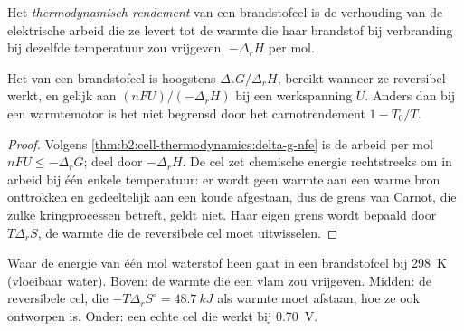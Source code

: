 \begin{definition}\label{def:b2:cell-thermodynamics:efficiency}
Het \emph{thermodynamisch rendement} van een
brandstofcel is de verhouding van de elektrische arbeid die ze levert tot de warmte die haar brandstof
bij verbranding bij dezelfde temperatuur zou vrijgeven, $-\Delta_r H$ per mol.
\end{definition}

\begin{proposition}\label{prop:b2:cell-thermodynamics:efficiency}
Het  van een brandstofcel is hoogstens $\Delta_r G/\Delta_r H$,
bereikt wanneer ze reversibel werkt, en gelijk aan $(nFU)/(-\Delta_r H)$ bij een
werkspanning $U$. Anders dan bij een warmtemotor is het niet begrensd door het carnotrendement
$1 - T_0/T$.
\end{proposition}

\begin{proof}
Volgens \cref{thm:b2:cell-thermodynamics:delta-g-nfe} is de arbeid per mol $nFU \leq
-\Delta_r G$; deel door $-\Delta_r H$. De cel zet chemische energie rechtstreeks
om in arbeid bij één enkele temperatuur: er wordt geen warmte aan een warme bron onttrokken en
gedeeltelijk aan een koude afgestaan, dus de grens van Carnot, die zulke kringprocessen betreft,
geldt niet. Haar eigen grens wordt bepaald door $T\Delta_r S$, de warmte die de reversibele
cel moet uitwisselen.
\end{proof}

\begin{omfigure}

{\small Waar de energie van één mol waterstof heen gaat in een brandstofcel bij
\qty{298}{K} (vloeibaar water). Boven: de warmte die een vlam zou vrijgeven. Midden: de
reversibele cel, die $-T\Delta_r S^\circ = \qty{48.7}{kJ}$ als warmte moet afstaan,
hoe ze ook ontworpen is. Onder: een echte cel die werkt bij \qty{0.70}{V}.}
\end{omfigure}

